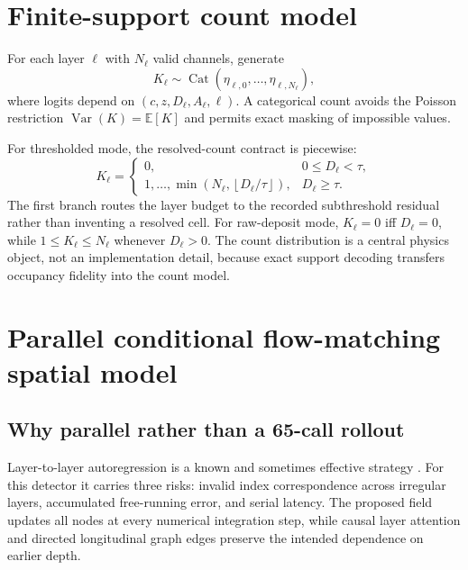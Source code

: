 \documentclass[11pt]{article}
\theoremstyle{definition}
\theoremstyle{remark}
\newcommand{\E}{\mathbb{E}}
\newcommand{\Cat}{\operatorname{Cat}}
\begin{document}
\section{Finite-support count model}
For each layer $\ell$ with $N_\ell$ valid channels, generate
\begin{equation}
  K_\ell\sim\Cat(\eta_{\ell,0},\ldots,\eta_{\ell,N_\ell}),
  \label{eq:count_cat}
\end{equation}
where logits depend on $(c,z,D_\ell,A_\ell,\ell)$. A categorical count avoids the Poisson restriction $\operatorname{Var}(K)=\E[K]$ and permits exact masking of impossible values.

For thresholded mode, the resolved-count contract is piecewise:
\begin{equation}
K_\ell=
\begin{cases}
0, & 0\le D_\ell<\tau,\\
1,\ldots,\min\!\left(N_\ell,\left\lfloor D_\ell/\tau\right\rfloor\right),
& D_\ell\ge\tau.
\end{cases}
\label{eq:count_feasible}
\end{equation}
The first branch routes the layer budget to the recorded subthreshold residual rather than inventing a resolved cell. For raw-deposit mode, $K_\ell=0$ iff $D_\ell=0$, while $1\le K_\ell\le N_\ell$ whenever $D_\ell>0$. The count distribution is a central physics object, not an implementation detail, because exact support decoding transfers occupancy fidelity into the count model.

\section{Parallel conditional flow-matching spatial model}

\subsection{Why parallel rather than a 65-call rollout}
Layer-to-layer autoregression is a known and sometimes effective strategy \citep{icaloflow,l2lflows,convl2lflows}. For this detector it carries three risks: invalid index correspondence across irregular layers, accumulated free-running error, and serial latency. The proposed field updates all nodes at every numerical integration step, while causal layer attention and directed longitudinal graph edges preserve the intended dependence on earlier depth.
\end{document}
